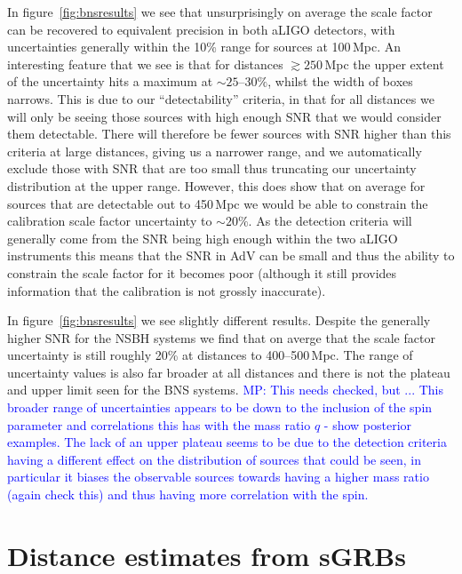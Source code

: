 \documentclass[10pt]{iopart}
\newcommand{\MP}[1]{\textcolor{blue}{MP: #1}}
\begin{document}
In figure~\ref{fig:bnsresults} we see that unsurprisingly on average the scale factor can be 
recovered to equivalent precision in both \ac{aLIGO} detectors, with uncertainties generally within 
the 10\% range for sources at 100\,Mpc. An interesting feature that we see is that for distances 
$\gtrsim 250$\,Mpc the upper extent of the uncertainty hits a maximum at $\sim 25\mbox{--}30\%$, 
whilst the width of boxes narrows. This is due to our ``detectability'' criteria, in that for all 
distances we will only be seeing those sources with high enough SNR that we would consider them 
detectable. There will therefore be fewer sources with SNR higher than this criteria at large 
distances, giving us a narrower range, and we automatically exclude those with SNR that are too 
small thus truncating our uncertainty distribution at the upper range. However, this does show that 
on average for sources that are detectable out to 450\,Mpc we would be able to constrain the 
calibration scale factor uncertainty to $\sim 20\%$. As the detection criteria will generally come 
from the SNR being high enough within the two \ac{aLIGO} instruments this means that the SNR in 
\ac{AdV} can be small and thus the ability to constrain the scale factor for it becomes poor 
(although it still provides information that the calibration is not grossly inaccurate).

In figure~\ref{fig:bnsresults} we see slightly different results. Despite the generally higher SNR 
for the \ac{NSBH} systems we find that on averge that the scale factor uncertainty is still roughly 
20\% at distances to 400--500\,Mpc. The range of uncertainty values is also far broader at all 
distances and there is not the plateau and upper limit seen for the \ac{BNS} systems. \MP{This 
needs checked, but ... This broader range of uncertainties appears to be down to the inclusion of 
the spin parameter and correlations this has with the mass ratio $q$ - show posterior examples. The 
lack of an upper plateau seems to be due to the detection criteria having a different effect on the 
distribution of sources that could be seen, in particular it biases the observable sources towards 
having a higher mass ratio (again check this) and thus having more correlation with the spin.}

\section{Distance estimates from \acp{sGRB}\label{sec:cosmo}}
\end{document}
